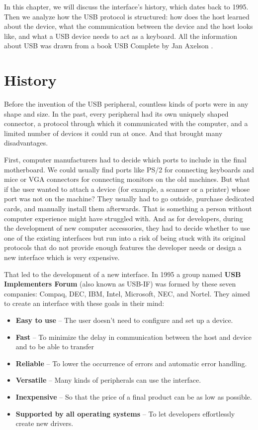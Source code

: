 In this chapter, we will discuss the interface's history, which dates back to 1995. Then we analyze how the USB protocol is structured: how does the host learned about the device, what the communication between the device and the host looks like, and what a USB device needs to act as a keyboard. All the information about USB was drawn from a book USB Complete by Jan Axelson \cite{USBComplete}.

\section{History}
\label{sec:history}
Before the invention of the USB peripheral, countless kinds of ports were in any shape and size. In the past, every peripheral had its own uniquely shaped connector, a protocol through which it communicated with the computer, and a limited number of devices it could run at once. And that brought many disadvantages.

First, computer manufacturers had to decide which ports to include in the final motherboard. We could usually find ports like PS/2 for connecting keyboards and mice or VGA connectors for connecting monitors on the old machines. But what if the user wanted to attach a device (for example, a scanner or a printer) whose port was not on the machine? They usually had to go outside, purchase dedicated cards, and manually install them afterwards. That is something a person without computer experience might have struggled with. And as for developers, during the development of new computer accessories, they had to decide whether to use one of the existing interfaces but run into a risk of being stuck with its original protocols that do not provide enough features the developer needs or design a new interface which is very expensive.

That led to the development of a new interface. In 1995 a group named \textbf{USB Implementers Forum} (also known as USB-IF) was formed by these seven companies: Compaq, DEC, IBM, Intel, Microsoft, NEC, and Nortel. They aimed to create an interface with these goals in their mind:
\begin{itemize}
    \item \textbf{Easy to use} \--- The user doesn't need to configure and set up a device.
    \item \textbf{Fast} \--- To minimize the delay in communication between the host and device and to be able to transfer
    \item \textbf{Reliable} \--- To lower the occurrence of errors and automatic error handling.
    \item \textbf{Versatile} \--- Many kinds of peripherals can use the interface.
    \item \textbf{Inexpensive} \--- So that the price of a final product can be as low as possible.
    \item \textbf{Supported by all operating systems} \--- To let developers effortlessly create new drivers.
\end{itemize}

